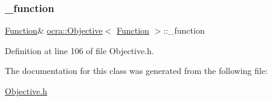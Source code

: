 \subsubsection{\texorpdfstring{\+\_\+function}{\_function}}
{\footnotesize\ttfamily \hyperlink{classocra_1_1Function}{Function}\& \hyperlink{classocra_1_1Objective}{ocra\+::\+Objective}$<$ \hyperlink{classocra_1_1Function}{Function} $>$\+::\+\_\+function\hspace{0.3cm}{\ttfamily [protected]}}



Definition at line 106 of file Objective.\+h.



The documentation for this class was generated from the following file\+:\begin{DoxyCompactItemize}
\item 
\hyperlink{Objective_8h}{Objective.\+h}\end{DoxyCompactItemize}
